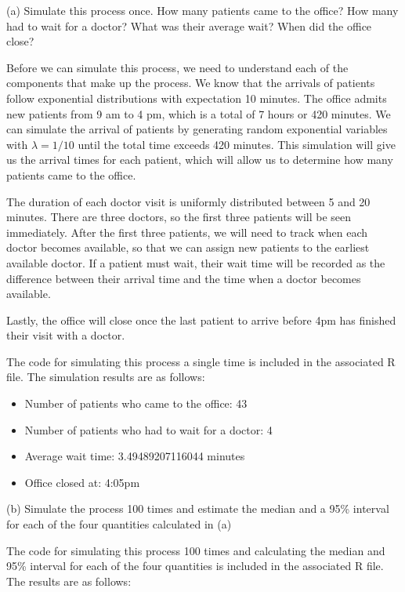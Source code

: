 \documentclass[12pt]{article}
\begin{document}
(a) Simulate this process once. How many patients came to the office? How many had to wait for a doctor? What was their average wait? When did the office close?

Before we can simulate this process, we need to understand each of the components that make up the process. We know that the
arrivals of patients follow exponential distributions with expectation 10 minutes. The office admits new patients from 9 am
to 4 pm, which is a total of 7 hours or 420 minutes. We can simulate the arrival of patients by generating random exponential
variables with $\lambda = 1/10$ until the total time exceeds 420 minutes. This simulation will give us the arrival times
for each patient, which will allow us to determine how many patients came to the office.

The duration of each doctor visit is uniformly distributed between 5 and 20 minutes. There are three doctors, so the first
three patients will be seen immediately. After the first three patients, we will need to track when each doctor becomes 
available, so that we can assign new patients to the earliest available doctor. If a patient must wait, their wait time will
be recorded as the difference between their arrival time and the time when a doctor becomes available.

Lastly, the office will close once the last patient to arrive before 4pm has finished their visit with a doctor.

The code for simulating this process a single time is included in the associated R file. 
The simulation results are as follows:

\begin{itemize}
\item Number of patients who came to the office: 43
\item Number of patients who had to wait for a doctor: 4
\item Average wait time: 3.49489207116044 minutes
\item Office closed at: 4:05pm
\end{itemize}

(b) Simulate the process 100 times and estimate the median and a 95\% interval for each of the four quantities calculated in (a)

The code for simulating this process 100 times and calculating the median and 95\% interval for each of the four quantities
is included in the associated R file. The results are as follows:
\end{document}
